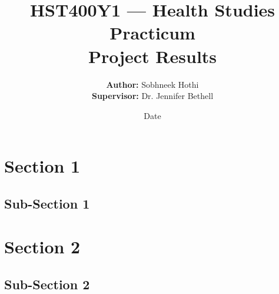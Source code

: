 \documentclass[letterpaper,12pt]{article}
\begin{document}
\title{HST400Y1 — Health Studies Practicum \\\textbf{Project Results}}
\author{\textbf{Author:} Sobhneek Hothi \\
\textbf{Supervisor:} Dr. Jennifer Bethell}
\date{Date}
\maketitle
\tableofcontents
\newpage

\section{Section 1}

\subsection{Sub-Section 1}

\section{Section 2}

\subsection{Sub-Section 2}
\end{document}
